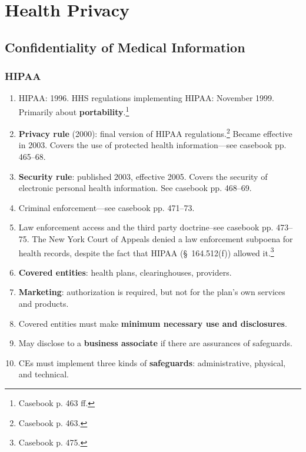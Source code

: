 \section{Health Privacy}

\subsection{Confidentiality of Medical Information}

\subsubsection{HIPAA}

\begin{enumerate}
    \item HIPAA: 1996. HHS regulations implementing HIPAA: November 1999.  
    Primarily about \textbf{portability}.\footnote{Casebook p. 463 ff.}
    \item \textbf{Privacy rule} (2000): final version of HIPAA 
    regulations.\footnote{Casebook p. 463.} Became effective in 2003. Covers the 
    use of protected health information---see casebook pp. 465--68.
    \item \textbf{Security rule}: published 2003, effective 2005. Covers the 
    security of electronic personal health information. See casebook pp.  
    468--69.
    \item Criminal enforcement---see casebook pp. 471--73.
    \item Law enforcement access and the third party doctrine--see casebook pp.  
    473--75. The New York Court of Appeals denied a law enforcement subpoena for 
    health records, despite the fact that HIPAA (\S\ 164.512(f)) allowed 
    it.\footnote{Casebook p. 475.}
    \item \textbf{Covered entities}: health plans, clearinghouses, providers.
    \item \textbf{Marketing}: authorization is required, but not for the plan's 
    own services and products.
    \item Covered entities must make \textbf{minimum necessary use and 
    disclosures}.
    \item May disclose to a \textbf{business associate} if there are assurances 
    of safeguards.
    \item CEs must implement three kinds of \textbf{safeguards}: administrative, 
    physical, and technical.
\end{enumerate}

